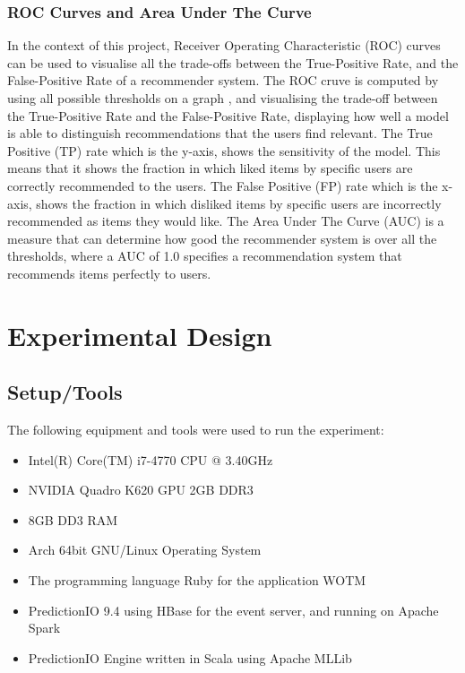 \subsubsection{ROC Curves and Area Under The Curve} \label{roc} \label{auc}
In the context of this project, Receiver Operating Characteristic (ROC) curves can be used to visualise all the trade-offs between the True-Positive Rate, and the False-Positive Rate of a recommender system. The ROC cruve is computed by using all possible thresholds on a graph , and visualising the trade-off between the True-Positive Rate and the False-Positive Rate, displaying how well a model is able to distinguish recommendations that the users find relevant. The True Positive (TP) rate which is the y-axis, shows the sensitivity of the model. This means that it shows the fraction in which liked items by specific users are correctly recommended to the users. The False Positive (FP) rate which is the x-axis, shows the fraction in which disliked items by specific users are incorrectly recommended as items they would like. The Area Under The Curve (AUC) is a measure that can determine how good the recommender system is over all the thresholds, where a AUC of 1.0 specifies a recommendation system that recommends items perfectly to users. 

\section{Experimental Design}

\subsection{Setup/Tools}
The following equipment and tools were used to run the experiment:
\begin{itemize}
	\item{Intel(R) Core(TM) i7-4770 CPU @ 3.40GHz}
	\item{NVIDIA Quadro K620 GPU 2GB DDR3}
	\item{8GB DD3 RAM}
	\item{Arch 64bit GNU/Linux Operating System}
	\item{The programming language Ruby for the application WOTM}
	\item{PredictionIO 9.4 using HBase for the event server, and running on Apache Spark}
	\item{PredictionIO Engine written in Scala using Apache MLLib}
\end{itemize}

